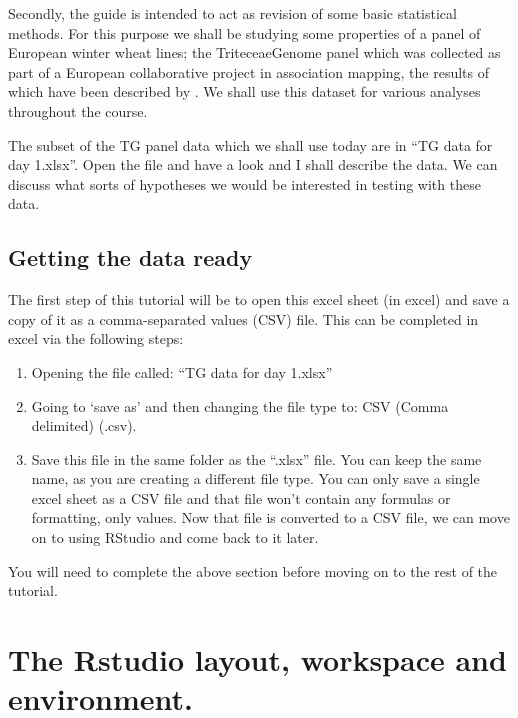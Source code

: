 \documentclass[
]{book}
\makeatletter
\newenvironment{kframe}{%
\medskip{}
\setlength{\fboxsep}{.8em}
 \def\at@end@of@kframe{}%
 \ifinner\ifhmode%
  \def\at@end@of@kframe{\end{minipage}}%
  \begin{minipage}{\columnwidth}%
 \fi\fi%
 \def\FrameCommand##1{\hskip\@totalleftmargin \hskip-\fboxsep
 \colorbox{shadecolor}{##1}\hskip-\fboxsep
     \hskip-\linewidth \hskip-\@totalleftmargin \hskip\columnwidth}%
 \MakeFramed {\advance\hsize-\width
   \@totalleftmargin\z@ \linewidth\hsize
   \@setminipage}}%
 {\par\unskip\endMakeFramed%
 \at@end@of@kframe}
\newenvironment{rmdblock}[1]
  {
  \begin{itemize}
  \renewcommand{\labelitemi}{
    \raisebox{-.7\height}[0pt][0pt]{
      {\setkeys{Gin}{width=3em,keepaspectratio}\texttt{[image: images/\#1]}}
    }
  }
  \setlength{\fboxsep}{1em}
  \begin{kframe}
  \item
  }
  {
  \end{kframe}
  \end{itemize}
  }
\newenvironment{rmdcaution}
  {\begin{rmdblock}{caution}}
  {\end{rmdblock}}
\makeatother
\begin{document}
Secondly, the guide is intended to act as revision of some basic statistical methods. For this purpose we shall be studying some properties of a panel of European winter wheat lines; the TriteceaeGenome panel which was collected as part of a European collaborative project in association mapping, the results of which have been described by \citep{Bentley2014}. We shall use this dataset for various analyses throughout the course.

The subset of the TG panel data which we shall use today are in ``TG data for day 1.xlsx''. Open the file and have a look and I shall describe the data. We can discuss what sorts of hypotheses we would be interested in testing with these data.

\hypertarget{getting-the-data-ready}{%
\subsection{Getting the data ready}\label{getting-the-data-ready}}

The first step of this tutorial will be to open this excel sheet (in excel) and save a copy of it as a comma-separated values (CSV) file. This can be completed in excel via the following steps:

\begin{enumerate}
\def\labelenumi{\arabic{enumi}.}
\item
  Opening the file called: ``TG data for day 1.xlsx''
\item
  Going to `save as' and then changing the file type to: CSV (Comma delimited) (.csv).
\item
  Save this file in the same folder as the ``.xlsx'' file. You can keep the same name, as you are creating a different file type. You can only save a single excel sheet as a CSV file and that file won't contain any formulas or formatting, only values. Now that file is converted to a CSV file, we can move on to using RStudio and come back to it later.
\end{enumerate}

\begin{rmdcaution}
You will need to complete the above section before moving on to the rest of the tutorial.
\end{rmdcaution}

\hypertarget{the-rstudio-layout-workspace-and-environment.}{%
\section{The Rstudio layout, workspace and environment.}\label{the-rstudio-layout-workspace-and-environment.}}
\end{document}
